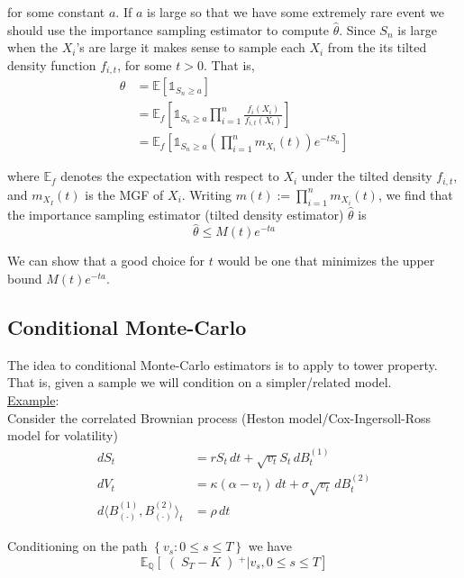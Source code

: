 \documentclass[12pt]{article}
\newlength\tindent
\renewcommand{\indent}{\hspace*{\tindent}}
\newcommand{\Q}{\mathbb Q}
\newcommand{\E}{\mathbb E}
\begin{document}
for some constant $a$. If $a$ is large so that we have some extremely rare event we should use the importance sampling estimator to compute $\hat{\theta}$. Since $S_n$ is large when the $X_i$'s are large it makes sense to sample each $X_i$ from the its tilted density function $f_{i,t}$, for some $t > 0$. That is,
\begin{align*}
	\theta &= \E \left[ \mathds 1_{S_n \geq a} \right] \\
	&= \E_f \left[ \mathds 1_{S_n \geq a} \prod^n_{i = 1} \frac{ f_i(X_i) }{ f_{i, t}(X_i) } \right] \\
	&= \E_f \left[ \mathds 1_{S_n \geq a} \left( \prod^n_{i = 1} m_{X_i}(t) \right) e^{ -tS_n } \right] 
\end{align*}

where $\E_f$ denotes the expectation with respect to $X_i$ under the tilted density $f_{i,t}$, and $m_{X_I}(t)$ is the MGF of $X_i$. Writing $m(t) := \prod^n_{i = 1} m_{X_i}(t)$, we find that the importance sampling estimator (tilted density estimator) $\hat{\theta}$ is 
\begin{equation*}
	\hat{\theta} \leq M(t)e^{-ta}
\end{equation*}

We can show that a good choice for $t$ would be one that minimizes the upper bound $M(t)e^{-ta}$.

\subsection{Conditional Monte-Carlo}

\indent The idea to conditional Monte-Carlo estimators is to apply to tower property. That is, given a sample we will condition on a simpler/related model. \\ 

\underline{Example}: \\

\indent Consider the correlated Brownian process (Heston model/Cox-Ingersoll-Ross model for volatility)
\begin{align*}
	dS_t &= rS_t\,dt + \sqrt{v_t}S_t\,dB^{(1)}_t \\
	dV_t &= \kappa(\alpha - v_t)\,dt + \sigma \sqrt{v_t}\,dB^{(2)}_t \\
	d\langle B^{(1)}_{(\cdot)}, B^{(2)}_{(\cdot)} \rangle_t &= \rho\,dt
\end{align*}

Conditioning on the path $\left\{ v_s: 0 \leq s \leq T \right\}$ we have
\begin{equation*}
	\E_\Q \left[ \right(S_T - K\left)^+ | v_s, 0 \leq s \leq T \right]
\end{equation*}
\end{document}
